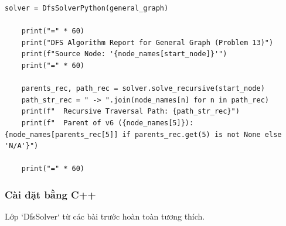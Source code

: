 \documentclass[a4paper,12pt]{article}
\begin{document}
\begin{lstlisting}[style=pythonstyle, caption={Cài đặt DFS cho đồ thị tổng quát trong Python.}, label={lst:python_dfs_13}]
    solver = DfsSolverPython(general_graph)
    
    print("=" * 60)
    print("DFS Algorithm Report for General Graph (Problem 13)")
    print(f"Source Node: '{node_names[start_node]}'")
    print("=" * 60)
    
    parents_rec, path_rec = solver.solve_recursive(start_node)
    path_str_rec = " -> ".join(node_names[n] for n in path_rec)
    print(f"  Recursive Traversal Path: {path_str_rec}")
    print(f"  Parent of v6 ({node_names[5]}): {node_names[parents_rec[5]] if parents_rec.get(5) is not None else 'N/A'}")
    
    print("=" * 60)
\end{lstlisting}

\subsubsection{Cài đặt bằng C++}
Lớp `DfsSolver` từ các bài trước hoàn toàn tương thích.
\end{document}
